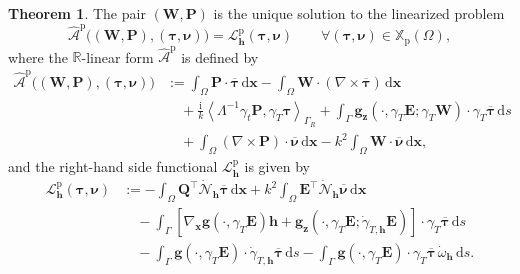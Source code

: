\documentclass[12pt,reqno]{amsart}
\theoremstyle{definition}
\newtheorem{theo}{Theorem}[section]
\numberwithin{equation}{section}
\begin{document}
\begin{theo}
The pair $(\mathbf{W}, \mathbf{P})$ is the unique solution to the linearized problem
\[
\widehat{\mathcal{A}}^{\mathrm{p}} \bigl( (\mathbf{W}, \mathbf{P}), (\boldsymbol{\tau}, \boldsymbol{\nu}) \bigr) = \mathcal{L}_{\mathbf{h}}^{\mathrm{p}}(\boldsymbol{\tau}, \boldsymbol{\nu}) \qquad \forall (\boldsymbol{\tau}, \boldsymbol{\nu}) \in \mathbb{X}_{\mathrm{p}}(\Omega),
\]
where the $\mathbb{R}$-linear form $\widehat{\mathcal{A}}^{\mathrm{p}}$ is defined by
\begin{equation*}
\begin{aligned}
\widehat{\mathcal{A}}^{\mathrm{p}} \bigl( (\mathbf{W}, \mathbf{P}), (\boldsymbol{\tau}, \boldsymbol{\nu}) \bigr) &:= \int_{\Omega} \mathbf{P} \cdot \overline{\boldsymbol{\tau}} \,\mathrm{d}\boldsymbol{x} - \int_{\Omega} \mathbf{W} \cdot (\nabla \times \overline{\boldsymbol{\tau}}) \,\mathrm{d}\boldsymbol{x} \\
&\quad + \frac{\mathrm{i}}{k} \left\langle \Lambda^{-1} \gamma_t \mathbf{P}, \gamma_T \boldsymbol{\tau} \right\rangle_{\Gamma_R} + \int_{\Gamma} \mathbf{g}_{\boldsymbol{z}}(\cdot, \gamma_T \mathbf{E}; \gamma_T \mathbf{W}) \cdot \gamma_T \overline{\boldsymbol{\tau}} \,\mathrm{d}s \\
&\quad + \int_{\Omega} (\nabla \times \mathbf{P}) \cdot \overline{\boldsymbol{\nu}} \,\mathrm{d}\boldsymbol{x} - k^2 \int_{\Omega} \mathbf{W} \cdot \overline{\boldsymbol{\nu}} \,\mathrm{d}\boldsymbol{x},
\end{aligned}
\end{equation*}
and the right-hand side functional $\mathcal{L}_{\mathbf{h}}^{\mathrm{p}}$ is given by
\begin{equation*}
\begin{aligned}
\mathcal{L}_{\mathbf{h}}^{\mathrm{p}}(\boldsymbol{\tau}, \boldsymbol{\nu}) &:= -\int_{\Omega} \mathbf{Q}^{\top} \dot{\mathcal{N}}_{\mathbf{h}} \overline{\boldsymbol{\tau}} \,\mathrm{d}\boldsymbol{x} + k^2 \int_{\Omega} \mathbf{E}^{\top} \dot{\mathcal{N}}_{\mathbf{h}} \overline{\boldsymbol{\nu}} \,\mathrm{d}\boldsymbol{x} \\
&\quad - \int_{\Gamma} \left[ \nabla_{\boldsymbol{x}} \mathbf{g}(\cdot, \gamma_T \mathbf{E}) \mathbf{h} + \mathbf{g}_{\boldsymbol{z}}(\cdot, \gamma_T \mathbf{E}; \dot{\gamma}_{T,\mathbf{h}} \mathbf{E}) \right] \cdot \gamma_T \overline{\boldsymbol{\tau}} \,\mathrm{d}s \\
&\quad - \int_{\Gamma} \mathbf{g}(\cdot, \gamma_T \mathbf{E}) \cdot \dot{\gamma}_{T,\mathbf{h}} \overline{\boldsymbol{\tau}} \,\mathrm{d}s - \int_{\Gamma} \mathbf{g}(\cdot, \gamma_T \mathbf{E}) \cdot \gamma_T \overline{\boldsymbol{\tau}} \, \dot{\omega}_{\mathbf{h}} \,\mathrm{d}s.
\end{aligned}
\end{equation*}
\end{theo}
\end{document}
